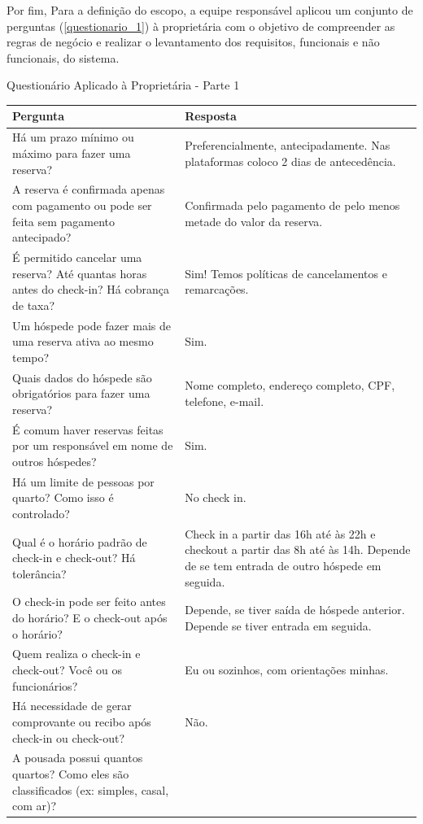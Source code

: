 \documentclass[
	12pt,				%
	openany,			%
	twoside,			%
	a4paper,			%
	english,			%
	french,				%
	spanish,			%
	brazil				%
	]{abntex2}
\begin{document}
Por fim, Para a definição do escopo, a equipe responsável aplicou um conjunto de perguntas (\autoref{questionario_1}) à proprietária com o objetivo de compreender as regras de negócio e realizar o levantamento dos requisitos, funcionais e não funcionais, do sistema. 
\begin{quadro}[H]
	\caption{Questionário Aplicado à Proprietária - Parte 1}
	 \label{questionario_1}
	  \begin{tabular}{|p{7.5cm}|p{7.5cm}|}
		\hline
		\textbf{Pergunta} & \textbf{Resposta}  \\ \hline
		Há um prazo mínimo ou máximo para fazer uma reserva? & Preferencialmente, antecipadamente. Nas plataformas coloco 2 dias de antecedência. 
		\\ \hline
		A reserva é confirmada apenas com pagamento ou pode ser feita sem pagamento antecipado? &
		Confirmada pelo pagamento de pelo menos metade do valor da reserva.
		\\ \hline
		É permitido cancelar uma reserva? Até quantas horas antes do check-in? Há cobrança de taxa? &
		Sim!  Temos políticas de cancelamentos e remarcações.
		\\ \hline
		Um hóspede pode fazer mais de uma reserva ativa ao mesmo tempo? &	Sim.
		\\ \hline
		Quais dados do hóspede são obrigatórios para fazer uma reserva? &
		Nome completo, endereço completo,  CPF, telefone, e-mail.
		\\ \hline
		É comum haver reservas feitas por um responsável em nome de outros hóspedes? &
		Sim.
		\\ \hline
		Há um limite de pessoas por quarto? Como isso é controlado? & No check in.
		\\ \hline
		Qual é o horário padrão de check-in e check-out? Há tolerância? &
		Check in a partir das 16h até às 22h e checkout a partir das 8h até às 14h.  Depende de se tem entrada de outro hóspede em seguida.
		\\ \hline
		O check-in pode ser feito antes do horário? E o check-out após o horário? &
		Depende, se tiver saída de hóspede anterior.  Depende se tiver entrada em seguida.
		\\ \hline
		Quem realiza o check-in e check-out? Você ou os funcionários? &
		Eu ou sozinhos, com orientações minhas. 
		\\ \hline
		Há necessidade de gerar comprovante ou recibo após check-in ou check-out? &
		Não.
		\\ \hline
		A pousada possui quantos quartos? Como eles são classificados (ex: simples, casal, com ar)? &

\end{tabular}
\end{quadro}
\end{document}
